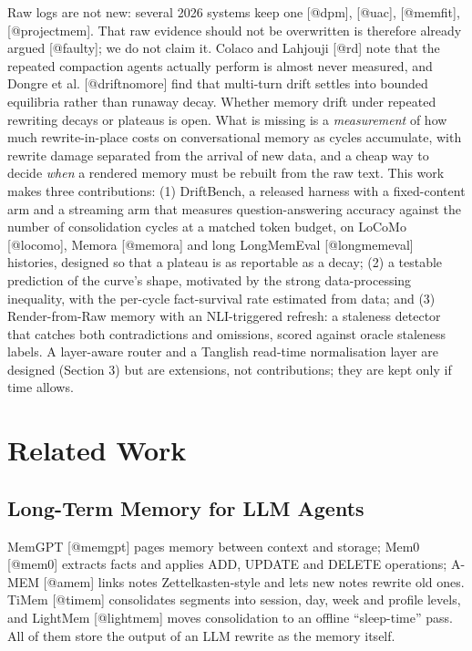 Raw logs are not new: several 2026 systems keep one [@dpm], [@uac], [@memfit], [@projectmem]. That raw evidence should not be overwritten is therefore already argued [@faulty]; we do not claim it. Colaco and Lahjouji [@rd] note that the repeated compaction agents actually perform is almost never measured, and Dongre et al. [@driftnomore] find that multi-turn drift settles into bounded equilibria rather than runaway decay. Whether memory drift under repeated rewriting decays or plateaus is open. What is missing is a \textit{measurement} of how much rewrite-in-place costs on conversational memory as cycles accumulate, with rewrite damage separated from the arrival of new data, and a cheap way to decide \textit{when} a rendered memory must be rebuilt from the raw text. This work makes three contributions:
(1) DriftBench, a released harness with a fixed-content arm and a streaming arm that measures question-answering accuracy against the number of consolidation cycles at a matched token budget, on LoCoMo [@locomo], Memora [@memora] and long LongMemEval [@longmemeval] histories, designed so that a plateau is as reportable as a decay;
(2) a testable prediction of the curve's shape, motivated by the strong data-processing inequality, with the per-cycle fact-survival rate estimated from data; and
(3) Render-from-Raw memory with an NLI-triggered refresh: a staleness detector that catches both contradictions and omissions, scored against oracle staleness labels.
A layer-aware router and a Tanglish read-time normalisation layer are designed (Section 3) but are extensions, not contributions; they are kept only if time allows.

\section{Related Work}

\subsection{Long-Term Memory for LLM Agents}
MemGPT [@memgpt] pages memory between context and storage; Mem0 [@mem0] extracts facts and applies ADD, UPDATE and DELETE operations; A-MEM [@amem] links notes Zettelkasten-style and lets new notes rewrite old ones. TiMem [@timem] consolidates segments into session, day, week and profile levels, and LightMem [@lightmem] moves consolidation to an offline ``sleep-time'' pass. All of them store the output of an LLM rewrite as the memory itself.


